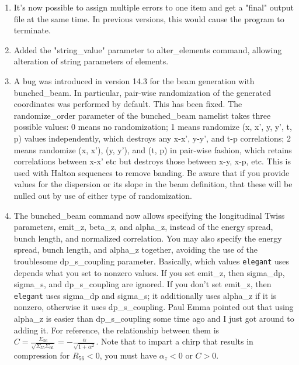 \documentclass[11pt]{article}
\begin{document}
\begin{enumerate}
\item It's now possible to assign multiple errors to one item and get a
"final" output file at the same time.  In previous versions, this
would cause the program to terminate.

\item Added the "string\_value" parameter to alter\_elements command,
allowing alteration of string parameters of elements.

\item A bug was introduced in version 14.3 for the beam generation
with bunched\_beam.  In particular, pair-wise randomization of the
generated coordinates was performed by default.  This has been fixed.
The randomize\_order parameter of the bunched\_beam namelist takes
three possible values: 0 means no randomization; 1 means randomize (x,
x', y, y', t, p) values independently, which destroys any x-x', y-y',
and t-p correlations; 2 means randomize (x, x'), (y, y'), and (t, p)
in pair-wise fashion, which retains correlations between x-x' etc but
destroys those between x-y, x-p, etc.  This is used with Halton
sequences to remove banding.  Be aware that if you provide values for
the dispersion or its slope in the beam definition, that these will be
nulled out by use of either type of randomization.

\item The bunched\_beam command now allows specifying the longitudinal
Twiss parameters, emit\_z, beta\_z, and alpha\_z, instead of the
energy spread, bunch length, and normalized correlation.  You may also
specify the energy spread, bunch length, and alpha\_z together,
avoiding the use of the troublesome dp\_s\_coupling parameter.
Basically, which values {\tt elegant} uses depends what you set to
nonzero values.  If you set emit\_z, then sigma\_dp, sigma\_s, and
dp\_s\_coupling are ignored.  If you don't set emit\_z, then {\tt
elegant} uses sigma\_dp and sigma\_s; it additionally uses alpha\_z if
it is nonzero, otherwise it uses dp\_s\_coupling.  Paul Emma pointed out
that using alpha\_z is easier than dp\_s\_coupling some time ago and I
just got around to adding it.  For reference, the relationship between
them is $ C = \frac{\Sigma_{56}}{\sqrt{\Sigma_{55}\Sigma_{66}}} =
-\frac{\alpha}{\sqrt{1+\alpha^2}}$.  Note that to impart a
chirp that results in compression for $R_{56}<0$, you must have
$\alpha_z<0$ or $C>0$.


\end{enumerate}
\end{document}
